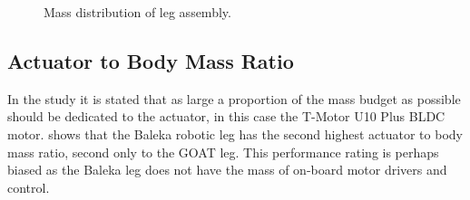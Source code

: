 \begin{figure}
\centering
{}

\caption{Mass distribution of leg assembly.}
\label{fig:Mass distribution of leg assembly}
\end{figure}

\subsection{Actuator to Body Mass Ratio}
In the study \cite{Kenneally2016} it is stated that as large a proportion of the mass budget as possible should be dedicated to the actuator, in this case the T-Motor U10 Plus BLDC motor.  shows that the Baleka robotic leg has the second highest actuator to body mass ratio, second only to the GOAT leg. This performance rating is perhaps biased as the Baleka leg does not have the mass of on-board motor drivers and control.

